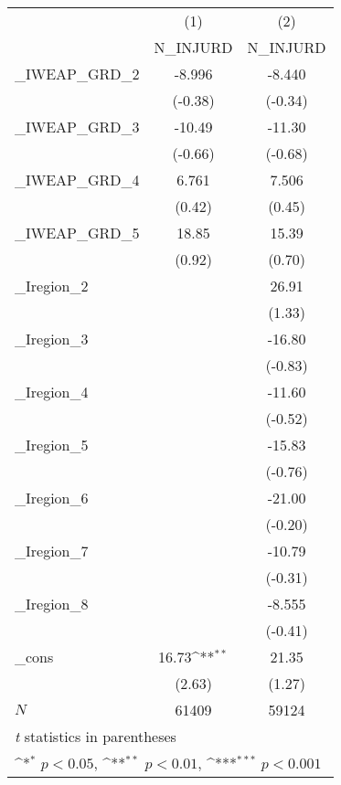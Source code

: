 {
\def\sym#1{\ifmmode^{#1}\else\(^{#1}\)\fi}
\begin{tabular}{l*{2}{c}}
\hline\hline
            &\multicolumn{1}{c}{(1)}&\multicolumn{1}{c}{(2)}\\
            &\multicolumn{1}{c}{N\_INJURD}&\multicolumn{1}{c}{N\_INJURD}\\
\hline
\_IWEAP\_GRD\_2&      -8.996         &      -8.440         \\
            &     (-0.38)         &     (-0.34)         \\
[1em]
\_IWEAP\_GRD\_3&      -10.49         &      -11.30         \\
            &     (-0.66)         &     (-0.68)         \\
[1em]
\_IWEAP\_GRD\_4&       6.761         &       7.506         \\
            &      (0.42)         &      (0.45)         \\
[1em]
\_IWEAP\_GRD\_5&       18.85         &       15.39         \\
            &      (0.92)         &      (0.70)         \\
[1em]
\_Iregion\_2  &                     &       26.91         \\
            &                     &      (1.33)         \\
[1em]
\_Iregion\_3  &                     &      -16.80         \\
            &                     &     (-0.83)         \\
[1em]
\_Iregion\_4  &                     &      -11.60         \\
            &                     &     (-0.52)         \\
[1em]
\_Iregion\_5  &                     &      -15.83         \\
            &                     &     (-0.76)         \\
[1em]
\_Iregion\_6  &                     &      -21.00         \\
            &                     &     (-0.20)         \\
[1em]
\_Iregion\_7  &                     &      -10.79         \\
            &                     &     (-0.31)         \\
[1em]
\_Iregion\_8  &                     &      -8.555         \\
            &                     &     (-0.41)         \\
[1em]
\_cons      &       16.73\sym{**} &       21.35         \\
            &      (2.63)         &      (1.27)         \\
\hline
\(N\)       &       61409         &       59124         \\
\hline\hline
\multicolumn{3}{l}{\footnotesize \textit{t} statistics in parentheses}\\
\multicolumn{3}{l}{\footnotesize \sym{*} \(p<0.05\), \sym{**} \(p<0.01\), \sym{***} \(p<0.001\)}\\
\end{tabular}
}
